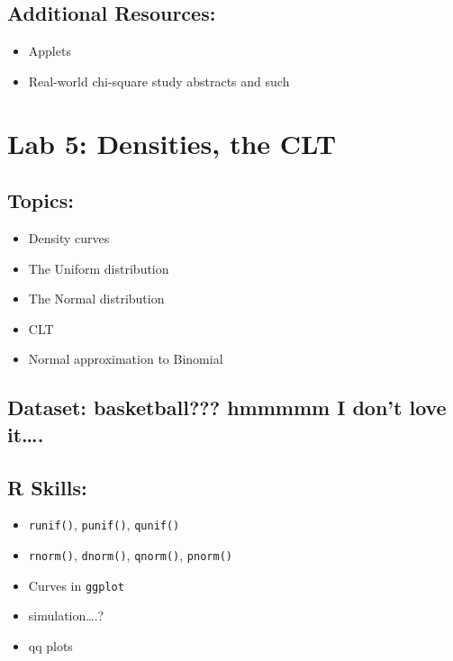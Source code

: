 \documentclass[]{article}
\providecommand{\tightlist}{%
  \setlength{\itemsep}{0pt}\setlength{\parskip}{0pt}}
\begin{document}
\subsection{Additional Resources:}\label{additional-resources-3}

\begin{itemize}
\tightlist
\item
  Applets
\item
  Real-world chi-square study abstracts and such
\end{itemize}

\section{Lab 5: Densities, the CLT}\label{lab-5-densities-the-clt}

\subsection{Topics:}\label{topics-4}

\begin{itemize}
\tightlist
\item
  Density curves
\item
  The Uniform distribution
\item
  The Normal distribution
\item
  CLT
\item
  Normal approximation to Binomial
\end{itemize}

\subsection{Dataset: basketball??? hmmmmm I don't love
it\ldots{}.}\label{dataset-basketball-hmmmmm-i-dont-love-it.}

\subsection{R Skills:}\label{r-skills-3}

\begin{itemize}
\tightlist
\item
  \texttt{runif()}, \texttt{punif()}, \texttt{qunif()}
\item
  \texttt{rnorm()}, \texttt{dnorm()}, \texttt{qnorm()}, \texttt{pnorm()}
\item
  Curves in \texttt{ggplot}
\item
  simulation\ldots{}.?
\item
  qq plots
\end{itemize}
\end{document}
